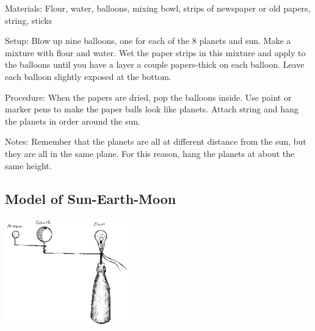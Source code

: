 \begin{multicols}{2}
\begin{description*}
\item[Materials:]{Flour, water, balloons, mixing bowl, strips of newspaper or old papers, string, sticks}
\item[Setup:]{Blow up nine balloons, one for each of the 8 planets and sun. Make a  mixture with flour and water. Wet the paper strips in this mixture and apply to the balloons until you have a layer a couple papers-thick on each balloon. Leave each balloon slightly exposed at the bottom.}
\item[Procedure:]{When the papers are dried, pop the balloons inside. Use paint or marker pens to make the paper balls look like planets. Attach string and hang the planets in order around the sun.}
\item[Notes:]{Remember that the planets are all at different distance from the sun, but they are all in the same plane. For this reason, hang the planets at about the same height.}
\end{description*}

\subsection{Model of Sun-Earth-Moon}

\begin{center}
\includegraphics[width=0.4\textwidth]{./img/source/sun-earth-moon.png}
\end{center}


\end{multicols}
